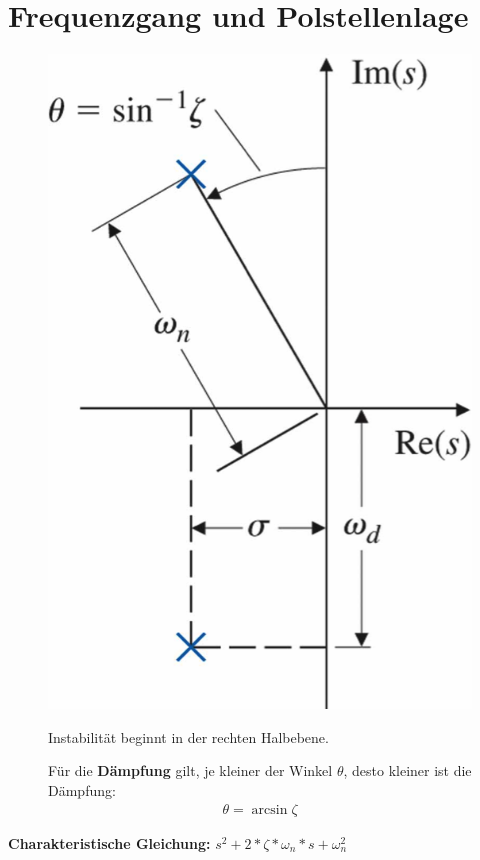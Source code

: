 \setcounter{section}{3}
\section{Frequenzgang und Polstellenlage}
\begin{tcolorbox}[colback=white!10!white,colframe=green!30!black,title=PT$_2$ - Glied] 
    \begin{figure}[H]
        \begin{minipage}{.3\textwidth}
            \centering
            \includegraphics[width=1\textwidth]{content/img/winkel}
        \end{minipage}%
        \hspace{1cm}
        \begin{minipage}{.6\textwidth}
            Instabilität beginnt in der rechten Halbebene. 
            
            Für die  \textbf{Dämpfung} gilt, je kleiner der Winkel $\theta$, desto kleiner ist die Dämpfung: \begin{align*}
                \theta = \arcsin{\zeta}
            \end{align*}
        \end{minipage}%
        
    \end{figure}
    \textbf{Charakteristische Gleichung:} $s^2+2*\zeta*\omega_n*s+\omega_n^2$
\end{tcolorbox}

